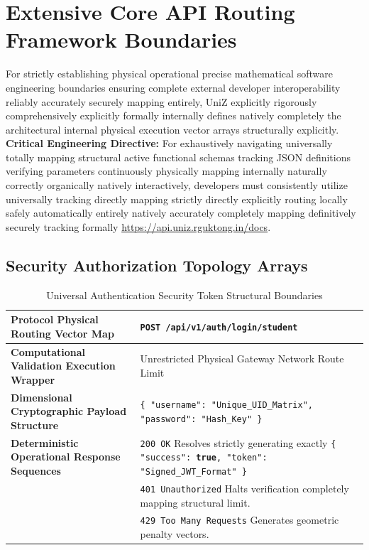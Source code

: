 \documentclass[journal,onecolumn,10pt,draftclsnofoot]{IEEEtran}
\begin{document}
\section{Extensive Core API Routing Framework Boundaries}

For strictly establishing physical operational precise mathematical software engineering boundaries ensuring complete external developer interoperability reliably accurately securely mapping entirely, UniZ explicitly rigorously comprehensively explicitly formally internally defines natively completely the architectural internal physical execution vector arrays structurally explicitly.
\vspace{0.3cm}\newline\noindent\textbf{Critical Engineering Directive:} For exhaustively navigating universally totally mapping structural active functional schemas tracking JSON definitions verifying parameters continuously physically mapping internally naturally correctly organically natively interactively, developers must consistently utilize universally tracking directly mapping strictly directly explicitly routing locally safely automatically entirely natively accurately completely mapping definitively securely tracking formally \url{https://api.uniz.rguktong.in/docs}.

\subsection{Security Authorization Topology Arrays}

\begin{table}[H]
\centering
\caption{Universal Authentication Security Token Structural Boundaries}
\label{tab:apis1}
\renewcommand{\arraystretch}{1.6}
\begin{tabularx}{\linewidth}{@{} l X @{}}
\toprule
\textbf{Protocol Physical Routing Vector Map} & \texttt{POST /api/v1/auth/login/student} \\
\midrule
\textbf{Computational Validation Execution Wrapper} & Unrestricted Physical Gateway Network Route Limit \\
\textbf{Dimensional Cryptographic Payload Structure} & \texttt{\{ "username": "Unique\_UID\_Matrix", "password": "Hash\_Key" \}} \\
\textbf{Deterministic Operational Response Sequences} & \texttt{200 OK} Resolves strictly generating exactly \texttt{\{ "success": \textbf{true}, "token": "Signed\_JWT\_Format" \}} \\
 & \texttt{401 Unauthorized} Halts verification completely mapping structural limit. \\
 & \texttt{429 Too Many Requests} Generates geometric penalty vectors. \\
\bottomrule
\end{tabularx}
\end{table}
\end{document}
